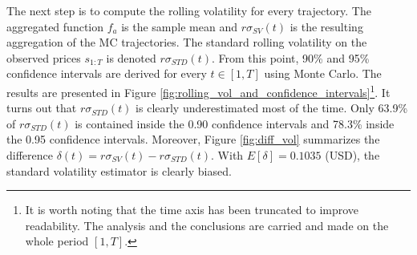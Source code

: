 \documentclass[11pt,a4,twosided,singlespacing,titlepagenumber=on]{scrreprt}
\numberwithin{equation}{chapter} %
\theoremstyle{remark}
\begin{document}
The next step is to compute the rolling volatility for every trajectory. The aggregated function $f_a$ is the sample mean and $r\sigma_{SV}(t)$ is the resulting aggregation of the MC trajectories. The standard rolling volatility on the observed prices $s_{1:T}$ is denoted $r\sigma_{STD}(t)$. From this point, 90\% and 95\% confidence intervals are derived for every $t \in [1,T]$ using Monte Carlo. The results are presented in Figure \ref{fig:rolling_vol_and_confidence_intervals}\footnote{It is worth noting that the time axis has been truncated to improve readability. The analysis and the conclusions are carried and made on the whole period $[1,T]$.}. It turns out that $r\sigma_{STD}(t)$ is clearly underestimated most of the time. Only 63.9\% of $r\sigma_{STD}(t)$ is contained inside the 0.90 confidence intervals and 78.3\% inside the 0.95 confidence intervals. Moreover, Figure \ref{fig:diff_vol} summarizes the difference $\delta(t) = r\sigma_{SV}(t) - r\sigma_{STD}(t)$. With $E[\delta] = 0.1035$ (USD), the standard volatility estimator is clearly biased.
\end{document}
